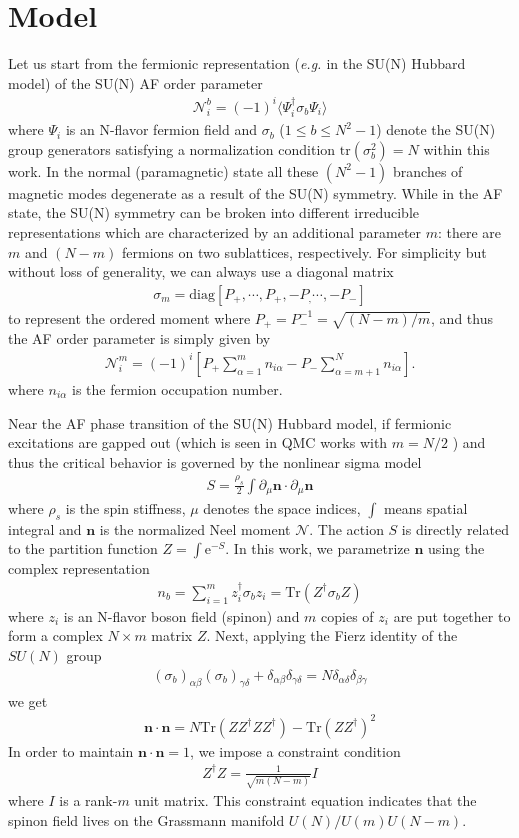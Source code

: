 \documentclass[aps,twocolumn,superscriptaddress]{revtex4-1}
\newcommand{\bea}{\begin{eqnarray}}
\newcommand{\eea}{\end{eqnarray}}
\newcommand{\bn}{\mathbf{n}}
\newcommand{\eg}{\textit{e.g.{ }}}
\newcommand{\me}{\mathrm{e}}
\begin{document}
\section{Model}
Let us start from the fermionic representation (\eg in the SU(N) Hubbard model) of the SU(N) AF order parameter \bea
\mathcal{N}_i^b=(-1)^i\langle \Psi_i^\dagger \sigma_b \Psi_i\rangle \eea where $\Psi_i$ is an N-flavor fermion field and
$\sigma_b$ ($1\le b\le N^2-1$) denote the SU(N) group generators satisfying a normalization condition
$\mathrm{tr}(\sigma_b^2)=N$ within this work. In the normal (paramagnetic) state all these $(N^2-1)$ branches of magnetic modes
degenerate as a result of the SU(N) symmetry. While in the AF state, the SU(N) symmetry can be broken into different
irreducible representations which are characterized by an additional parameter $m$: there are $m$ and $(N-m)$ fermions on two sublattices, respectively. For simplicity but without loss of generality, we can always use a diagonal matrix \bea
\sigma_m=\text{diag}\left[P_+,\cdots,P_+,-P_,\cdots,-P_-\right] \eea to represent the ordered moment where
$P_+=P_-^{-1}=\sqrt{(N-m)/m}$, and thus the AF order parameter is simply given by \bea
\mathcal{N}_i^m=(-1)^i\left[P_+\sum_{\alpha=1}^m n_{i\alpha}-P_-\sum_{\alpha=m+1}^{N}n_{i\alpha} \right]. \eea where
$n_{i\alpha}$ is the fermion occupation number. 

Near the AF phase transition of the SU(N) Hubbard model, if fermionic excitations are gapped out (which is seen in QMC
works with $m=N/2$ \cite{cai2013,wang2014}) and thus the critical behavior is governed by the nonlinear sigma model \bea
\label{eq:NLsM}S=\frac{\rho_s}{2}\int \partial_\mu\bn \cdot \partial_\mu\bn \eea where $\rho_s$ is the spin stiffness,
$\mu$ denotes the space indices, $\int$ means spatial integral and $\bn$ is the normalized Neel moment $\mathcal{N}$.
The action $S$ is directly related to the partition function $Z=\int \me^{-S}$. In this work, we parametrize $\bn$ using
the complex representation \bea \label{eq:cprep}n_b=\sum_{i=1}^m z_i^\dag \sigma_b z_i=\mathrm{Tr}(Z^\dag\sigma_b Z)
\eea where $z_i$ is an N-flavor boson field (spinon) and $m$ copies of $z_i$ are put together to form a complex
$N\times m$ matrix $Z$. Next, applying the Fierz identity of the $SU(N)$ group \bea \label{eq:Fierz}
(\sigma_b)_{\alpha\beta}
(\sigma_b)_{\gamma\delta}+\delta_{\alpha\beta}\delta_{\gamma\delta}=N\delta_{\alpha\delta}\delta_{\beta\gamma} \eea we
get \bea \bn\cdot\bn = N\mathrm{Tr}(ZZ^\dag Z Z^\dag)-\mathrm{Tr}(ZZ^\dag)^2 \eea In order to maintain $\bn\cdot\bn=1$,
we impose a constraint condition \bea Z^\dag Z=\frac{1}{\sqrt{m(N-m)}}I \label{eq:normalizeZ}\eea where $I$ is a
rank-$m$ unit matrix. This constraint equation indicates that the spinon field lives on the Grassmann manifold
$U(N)/U(m)U(N-m)$. 
\end{document}
